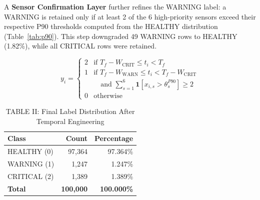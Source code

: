 \documentclass[conference]{IEEEtran}
\begin{document}
A \textbf{Sensor Confirmation Layer} further refines the WARNING label: a
WARNING is retained only if at least 2 of the 6 high-priority sensors exceed
their respective P90 thresholds computed from the HEALTHY distribution
(Table~\ref{tab:p90}). This step downgraded 49 WARNING rows to HEALTHY
(1.82\%), while all CRITICAL rows were retained.

\begin{equation}
y_i = \begin{cases}
2 & \text{if } T_f - W_{\text{CRIT}} \leq t_i < T_f \\
1 & \text{if } T_f - W_{\text{WARN}} \leq t_i < T_f - W_{\text{CRIT}} \\
  & \quad \text{and } \sum_{s=1}^{6} \mathbf{1}[x_{i,s} > \theta_s^{P90}] \geq 2 \\
0 & \text{otherwise}
\end{cases}
\label{eq:label}
\end{equation}


\begin{table}[htbp]
\caption{TABLE II: Final Label Distribution After Temporal Engineering}
\centering
\begin{tabular}{lrr}
\hline
\textbf{Class} & \textbf{Count} & \textbf{Percentage} \\
\hline
HEALTHY (0)  & 97,364 & 97.364\% \\
WARNING (1)  &  1,247 &  1.247\% \\
CRITICAL (2) &  1,389 &  1.389\% \\
\hline
\textbf{Total} & \textbf{100,000} & \textbf{100.000\%} \\
\hline
\end{tabular}
\label{tab:label_dist}
\end{table}
\end{document}

